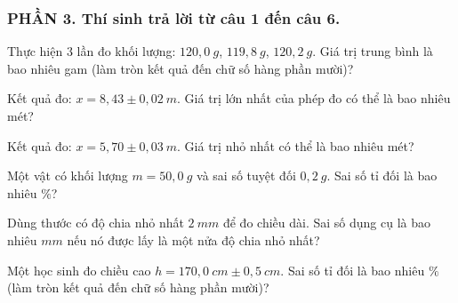 \subsubsection*{PHẦN 3. Thí sinh trả lời từ câu 1 đến câu 6.}
\setcounter{ex}{0}
\begin{ex}%
Thực hiện $3$ lần đo khối lượng: $120,0\ g$, $119,8\ g$, $120,2\ g$. Giá trị trung bình là bao nhiêu gam (làm tròn kết quả đến chữ số hàng phần mười)?
\end{ex}

\begin{ex}%
Kết quả đo: $x = 8,43 \pm 0,02\ m$. Giá trị lớn nhất của phép đo có thể là bao nhiêu mét?
\end{ex}

\begin{ex}%
Kết quả đo: $x = 5,70 \pm 0,03\ m$. Giá trị nhỏ nhất có thể là bao nhiêu mét?
\end{ex}

\begin{ex}%
Một vật có khối lượng $m = 50,0\ g$ và sai số tuyệt đối $0,2\ g$. Sai số tỉ đối là bao nhiêu $\%$?
\end{ex}
\begin{ex}%
Dùng thước có độ chia nhỏ nhất $2\ mm$ để đo chiều dài. Sai số dụng cụ là bao nhiêu $mm$ nếu nó được lấy là một nửa độ chia nhỏ nhất?
\end{ex}


\begin{ex}%
Một học sinh đo chiều cao $h = 170,0\ cm \pm 0,5\ cm$. Sai số tỉ đối là bao nhiêu $\%$ (làm tròn kết quả đến chữ số hàng phần mười)?
\end{ex}